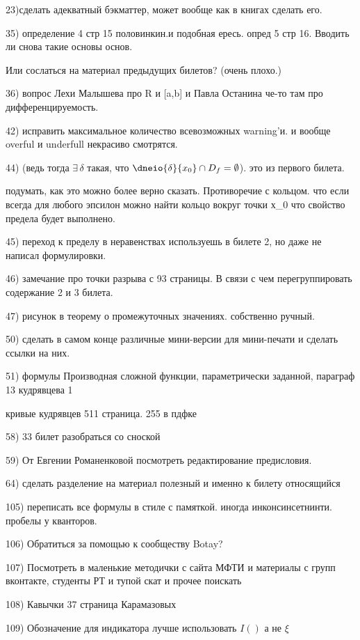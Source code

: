 23)сделать адекватный бэкматтер, может вообще как в книгах сделать его.

35) определение 4 стр 15 половинкин.и подобная ересь.
опред 5 стр 16. Вводить ли снова такие основы основ. 

Или сослаться на материал предыдущих билетов? (очень плохо.)

36) вопрос Лехи Малышева про R и [a,b] и Павла Останина че-то там про дифференцируемость.

42) исправить максимальное количество всевозможных warning'и. и вообще overful и underfull некрасиво смотрятся.

44) (ведь тогда $\exists\, \delta$ такая, что $\dneio{\delta}{x_0}\cap D_f=\emptyset$). это из первого билета.

подумать, как это можно более верно сказать. Противоречие с кольцом. что если всегда для любого эпсилон можно найти кольцо вокруг точки х_0 что свойство предела будет выполнено.

45) переход к пределу в неравенствах используешь в билете 2, но даже не написал формулировки.

46) замечание про точки разрыва с 93 страницы. В связи с чем перегруппировать содержание 2 и 3 билета.

47) рисунок в теорему о промежуточных значениях. собственно ручный.

50) сделать в самом конце различные мини-версии для мини-печати и сделать ссылки на них.

51) формулы Производная сложной функции, параметрически заданной, параграф 13 кудрявцева 1

кривые кудрявцев 511 страница. 255 в пдфке

58) 33 билет разобраться со сноской

59) От Евгении Романенковой посмотреть редактирование предисловия.

64) сделать разделение на материал полезный и именно к билету относящийся

105) переписать все формулы в стиле с памяткой. иногда инконсинсетнинти. пробелы у кванторов. 

106) Обратиться за помощью к сообществу Botay? 

107) Посмотреть в маленькие методички с сайта МФТИ и материалы с групп вконтакте, студенты РТ и тупой скат и прочее поискать

108) Кавычки 37 страница Карамазовых

109) Обозначение для индикатора лучше использовать $I()$ а не $\xi$

